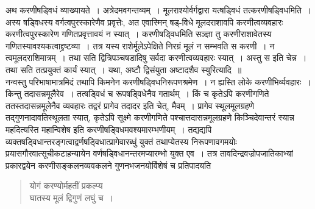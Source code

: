 \documentclass[11pt, openany]{book}
\begin{document}
\vspace{2mm}
 अथ करणीषड्विधं व्याख्यायते~। अत्रेदमवगन्तव्यम्~। मूलराश्योर्वर्गद्वारा यत्षड्विधं तत्करणीषड्विधमिति~। अस्य षड्विधस्य वर्गत्वपुरस्कारेणैव प्रवृत्तेः, अत एवास्मिन् षड्-विधे मूलदराशावपि करणीत्वव्यवहारः करणीत्वपुरस्कारेण गणितप्रवृत्तावयं न स्यात्~। करणीषड्विधमिति सञ्ज्ञा तु करणीराशावेतस्य गणितस्यावश्यकत्वाद्द्रष्टव्या~। तत्र यस्य राशेर्मूलेऽपेक्षिते निरग्रं मूलं न सम्भवति स करणी~। न त्वमूलदराशिमात्रम्~। तथा सति द्वित्रिपञ्चषडादिषु सर्वदा करणीत्वव्यवहारः स्यात्~। अस्तु स इति 
चेन्न~। तथा सति तत्प्रयुक्तं कार्यं स्यात्~। यथा, अष्टौ द्विसंयुता अष्टादशैव स्युरित्यादि~॥ \\

\vspace{-3mm}
 नन्वस्तु परिभाषामात्रमिदं तथापि किमनेन करणीषड्विधनिरूपणश्रमेण~। 
न ह्यस्ति लोके करणीभिर्व्यवहारः~। किन्तु तदासन्नमूलैरेव~। तत्षड्विधं च 
रूपषड्विधेनैव गतार्थम्~। किं च कृतेऽपि करणीगणिते ततस्तदासन्नमूलेनैव
व्यवहारः तद्वरं प्रागेव तदादर इति चेत्, मैवम्~। प्रागेव स्थूलमूलग्रहणे
तद्गुणनादावतिस्थूलता स्यात्, कृतेऽपि सूक्ष्मे करणीगणिते पश्चात्तदासन्नमूलग्रहणे 
किञ्चिदेवान्तरं स्यान्न महदित्यस्ति महान्विशेष इति
करणीषड्विधमवश्यमारम्भणीयम्~। तद्यद्यपि व्यक्तषड्विधान्तरङ्गत्वाद्वर्णषड्विधात्प्रागेवारब्धुं
युक्तं तथाप्येतस्य निरूपणावगमयोः प्रयासगौरवात्सूचीकटाहन्यायेन वर्णषड्विधानन्तरमप्यारम्भो युक्त एव~। तत्र तावदिन्द्रवज्रोपजातिकाभ्यां प्रकारद्वयेन करणीसङ्कलनव्यवकलने गुणनभजनयोर्विशेषं च प्रतिपादयति\textendash 

 \label{1.12.1}
\begin{quote}
    \bs
     योगं करण्योर्महतीं प्रकल्प्य \\
 
 \vspace{-7mm}
\hspace{1cm} घातस्य मूलं द्विगुणं लघुं च~।
\end{quote}

\afterpage{\fancyhead[RO,LE]{\textbf{\thepage}}}
\cfoot{}
\newpage
\end{document}
